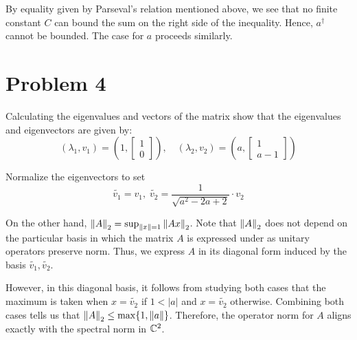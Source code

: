 \documentclass[12pt]{article}%
\begin{document}
By equality given by Parseval's relation mentioned above, we see that no finite constant $C$ can bound the sum on the right side of the inequality. Hence, $a^\dagger $ cannot be bounded. The case for $a$ proceeds similarly.

\section{Problem 4}

Calculating the eigenvalues and vectors of the matrix show that the eigenvalues and eigenvectors are given by:
\[ (\lambda_1, v_1) = (1, \begin{bmatrix}
  1 \\ 0
\end{bmatrix}), \quad (\lambda_2, v_2) = (a, \begin{bmatrix}
    1 \\ a-1
\end{bmatrix}) \]

Normalize the eigenvectors to set $$ \tilde{v_1} = v_1, \; \tilde{v_2} = \frac{1}{\sqrt{a^2 - 2a + 2}} \cdot v_2$$

On the other hand, $\norm{A}_2 = \sup_{\norm{x} = 1} \norm{Ax}_2$. Note that $\norm{A}_2$ does not depend on the particular basis in which the matrix $A$ is expressed under as unitary operators preserve norm. Thus, we express $A$ in its diagonal form induced by the basis $\tilde{v_1}, \tilde{v_2}$. \newline

However, in this diagonal basis, it follows from studying both cases that the maximum is taken when $x = \tilde{v_2}$ if $1 < |a|$ and $x = \tilde{v_2}$ otherwise. Combining both cases tells us that $\norm{A}_2 \leq \max\{1, \norm{a}\}$. Therefore, the operator norm for $A$ aligns exactly with the spectral norm in ${\mathbb{C}}^2$.
\end{document}
